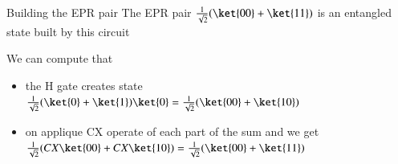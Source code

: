 \begin{frame}{Building the EPR pair}
The EPR pair $\frac{1}{\sqrt{2}}(\ket{00}+\ket{11})$ is an entangled state built by this circuit
\begin{center}
\end{center}
We can compute that
\begin{itemize}
    \item the H gate creates state  $\frac{1}{\sqrt{2}}(\ket{0}+\ket{1})\ket{0} = \frac{1}{\sqrt{2}}(\ket{00}+\ket{10})$
    \item on applique CX operate of each part of the sum and we get 
    $\frac{1}{\sqrt{2}}(CX\ket{00}+CX\ket{10}) = \frac{1}{\sqrt{2}}(\ket{00}+\ket{11})$
\end{itemize}

\end{frame}

